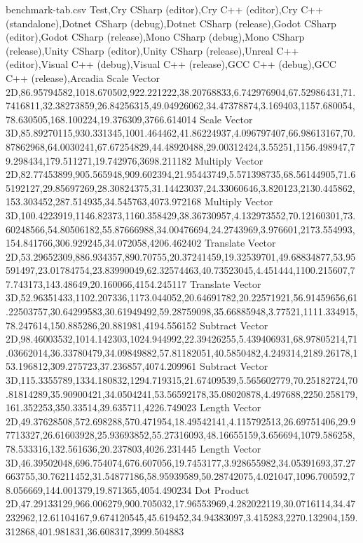 \begin{filecontents*}{benchmark-tab.csv}
Test,Cry CSharp (editor),Cry C++ (editor),Cry C++ (standalone),Dotnet CSharp (debug),Dotnet CSharp (release),Godot CSharp (editor),Godot CSharp (release),Mono CSharp (debug),Mono CSharp (release),Unity CSharp (editor),Unity CSharp (release),Unreal C++ (editor),Visual C++ (debug),Visual C++ (release),GCC C++ (debug),GCC C++ (release),Arcadia
Scale Vector 2D,86.95794582,1018.670502,922.221222,38.20768833,6.742976904,67.52986431,71.7416811,32.38273859,26.84256315,49.04926062,34.47378874,3.169403,1157.680054,78.630505,168.100224,19.376309,3766.614014
Scale Vector 3D,85.89270115,930.331345,1001.464462,41.86224937,4.096797407,66.98613167,70.87862968,64.0030241,67.67254829,44.48920488,29.00312424,3.55251,1156.498947,79.298434,179.511271,19.742976,3698.211182
Multiply Vector 2D,82.77453899,905.565948,909.602394,21.95443749,5.571398735,68.56144905,71.65192127,29.85697269,28.30824375,31.14423037,24.33060646,3.820123,2130.445862,153.303452,287.514935,34.545763,4073.972168
Multiply Vector 3D,100.4223919,1146.82373,1160.358429,38.36730957,4.132973552,70.12160301,73.60248566,54.80506182,55.87666988,34.00476694,24.2743969,3.976601,2173.554993,154.841766,306.929245,34.072058,4206.462402
Translate Vector 2D,53.29652309,886.934357,890.70755,20.37241459,19.32539701,49.68834877,53.95591497,23.01784754,23.83990049,62.32574463,40.73523045,4.451444,1100.215607,77.743173,143.48649,20.160066,4154.245117
Translate Vector 3D,52.96351433,1102.207336,1173.044052,20.64691782,20.22571921,56.91459656,61.22503757,30.64299583,30.61949492,59.28759098,35.66885948,3.77521,1111.334915,78.247614,150.885286,20.881981,4194.556152
Subtract Vector 2D,98.46003532,1014.142303,1024.944992,22.39426255,5.439406931,68.97805214,71.03662014,36.33780479,34.09849882,57.81182051,40.5850482,4.249314,2189.26178,153.196812,309.275723,37.236857,4074.209961
Subtract Vector 3D,115.3355789,1334.180832,1294.719315,21.67409539,5.565602779,70.25182724,70.81814289,35.90900421,34.0504241,53.56592178,35.08020878,4.497688,2250.258179,161.352253,350.33514,39.635711,4226.749023
Length Vector 2D,49.37628508,572.698288,570.471954,18.49542141,4.115792513,26.69751406,29.97713327,26.61603928,25.93693852,55.27316093,48.16655159,3.656694,1079.586258,78.533316,132.561636,20.237803,4026.231445
Length Vector 3D,46.39502048,696.754074,676.607056,19.7453177,3.928655982,34.05391693,37.27663755,30.76211452,31.54877186,58.95939589,50.28742075,4.021047,1096.700592,78.056669,144.001379,19.871365,4054.490234
Dot Product 2D,47.29133129,966.006279,900.705032,17.96553969,4.282022119,30.0716114,34.47232962,12.61104167,9.674120545,45.619452,34.94383097,3.415283,2270.132904,159.312868,401.981831,36.608317,3999.504883

\end{filecontents*}
